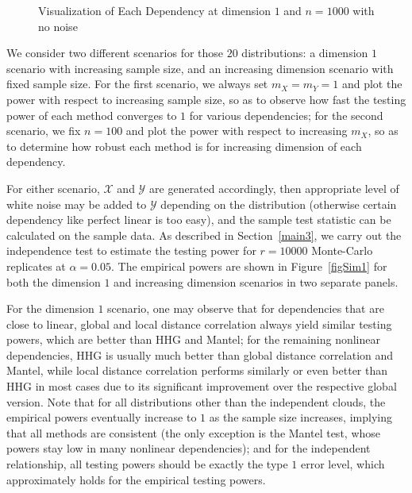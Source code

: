 \documentclass[11pt]{article}
\begin{document}
\begin{figure}[htbp]
\caption{Visualization of Each Dependency at dimension $1$ and $n=1000$ with no noise}
\label{fig0}
\end{figure}

We consider two different scenarios for those $20$ distributions: a dimension $1$ scenario with increasing sample size, and an increasing dimension scenario with fixed sample size. For the first scenario, we always set $m_{X}=m_{Y}=1$ and plot the power with respect to increasing sample size, so as to observe how fast the testing power of each method converges to $1$ for various dependencies; for the second scenario, we fix $n=100$ and plot the power with respect to increasing $m_{X}$, so as to determine how robust each method is for increasing dimension of each dependency. 

For either scenario, $\mathcal{X}$ and $\mathcal{Y}$ are generated accordingly, then appropriate level of white noise may be added to $\mathcal{Y}$ depending on the distribution (otherwise certain dependency like perfect linear is too easy), and the sample test statistic can be calculated on the sample data. As described in Section~\ref{main3}, we carry out the independence test to estimate the testing power for $r=10000$ Monte-Carlo replicates at $\alpha=0.05$. The empirical powers are shown in Figure~\ref{figSim1} for both the dimension $1$ and increasing dimension scenarios in two separate panels. 

For the dimension $1$ scenario, one may observe that for dependencies that are close to linear, global and local distance correlation always yield similar testing powers, which are better than HHG and Mantel; for the remaining nonlinear dependencies, HHG is usually much better than global distance correlation and Mantel, while local distance correlation performs similarly or even better than HHG in most cases due to its significant improvement over the respective global version. Note that for all distributions other than the independent clouds, the empirical powers eventually increase to $1$ as the sample size increases, implying that all methods are consistent (the only exception is the Mantel test, whose powers stay low in many nonlinear dependencies); and for the independent relationship, all testing powers should be exactly the type $1$ error level, which approximately holds for the empirical testing powers. 
\end{document}
